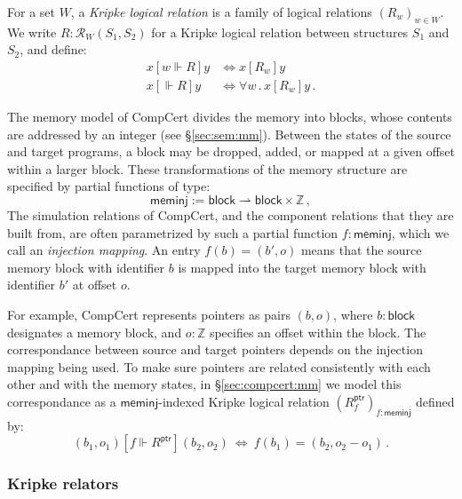 \documentclass[sigplan,10pt,review,anonymous]{acmart}
\newcommand{\kw}[1]{\ensuremath{ \mathsf{#1} }}
\newcommand{\ifr}[1]{\mathrel{[{#1}]}}
\begin{document}
\begin{definition}
For a set $W$,
a \emph{Kripke logical relation} is
a family of logical relations $(R_w)_{w \in W}$.
We write $R : \mathcal{R}_W(S_1, S_2)$
for a Kripke logical relation between structures $S_1$ and $S_2$,
and define:
\begin{align*}
  x \ifr{w \Vdash R} y &\Leftrightarrow x \ifr{R_w} y \\
  x \ifr{\Vdash R} y &\Leftrightarrow \forall w \,.\, x \ifr{R_w} y \,.
\end{align*}
\end{definition}

\begin{example} \label{ex:meminj} %
The memory model of CompCert divides the memory into blocks,
whose contents are addressed by an integer
(see \S\ref{sec:sem:mm}).
Between the states of the source and target programs,
a block may be dropped, added, or
mapped at a given offset within a larger block.
These transformations of the memory structure
are specified by partial functions of type:
\[
  \kw{meminj} := \kw{block} \rightharpoonup \kw{block} \times \mathbb{Z} \,,
\]
The simulation relations of CompCert,
and the component relations that they are built from,
are often parametrized by such a partial function $f : \kw{meminj}$,
which we call an \emph{injection mapping}.
An entry $f(b) = (b', o)$
means that the source memory block with identifier $b$
is mapped into the target memory block with identifier $b'$
at offset $o$.

For example,
CompCert represents pointers as pairs $(b, o)$, where
$b : \kw{block}$ designates a memory block, and
$o : \mathbb{Z}$ specifies an offset within the block.
The correspondance between source and target pointers
depends on the injection mapping being used.
To make sure pointers are related consistently
with each other and with the memory states,
in \S\ref{sec:compcert:mm}
we model this correspondance as a $\kw{meminj}$-indexed
Kripke logical relation $(R^\kw{ptr}_f)_{f : \kw{meminj}}$
defined by:
\[
    (b_1, o_1) \ifr{f \Vdash R^\kw{ptr}} (b_2, o_2) \:\Leftrightarrow\:
    f(b_1) = (b_2, o_2 - o_1) \,.
\]
\end{example}

\subsubsection{Kripke relators}
\end{document}
